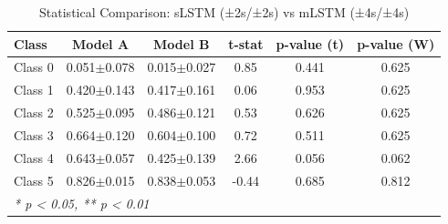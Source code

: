 \begin{table}[htbp]
\centering
\caption{Statistical Comparison: sLSTM (±2s/±2s) vs mLSTM (±4s/±4s)}
\label{tab:comparison_class_slstm_±2s_±2s_vs_mlstm_±4s_±4s}
\begin{tabular}{lccccc}
\toprule
\textbf{Class} & \textbf{Model A} & \textbf{Model B} & \textbf{t-stat} & \textbf{p-value (t)} & \textbf{p-value (W)} \\
\midrule
Class 0 & 0.051$\pm$0.078 & 0.015$\pm$0.027 & 0.85 & 0.441 & 0.625 \\
Class 1 & 0.420$\pm$0.143 & 0.417$\pm$0.161 & 0.06 & 0.953 & 0.625 \\
Class 2 & 0.525$\pm$0.095 & 0.486$\pm$0.121 & 0.53 & 0.626 & 0.625 \\
Class 3 & 0.664$\pm$0.120 & 0.604$\pm$0.100 & 0.72 & 0.511 & 0.625 \\
Class 4 & 0.643$\pm$0.057 & 0.425$\pm$0.139 & 2.66 & 0.056 & 0.062 \\
Class 5 & 0.826$\pm$0.015 & 0.838$\pm$0.053 & -0.44 & 0.685 & 0.812 \\
\bottomrule
\multicolumn{6}{l}{\textit{* p < 0.05, ** p < 0.01}} \\
\end{tabular}
\end{table}